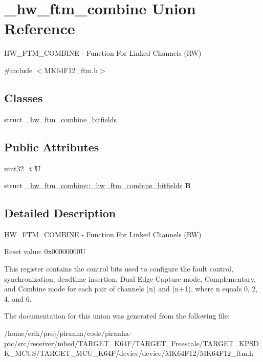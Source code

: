 \hypertarget{union__hw__ftm__combine}{}\section{\+\_\+hw\+\_\+ftm\+\_\+combine Union Reference}
\label{union__hw__ftm__combine}


H\+W\+\_\+\+F\+T\+M\+\_\+\+C\+O\+M\+B\+I\+NE -\/ Function For Linked Channels (RW)  




{\ttfamily \#include $<$M\+K64\+F12\+\_\+ftm.\+h$>$}

\subsection*{Classes}
\begin{DoxyCompactItemize}
\item 
struct \hyperlink{struct__hw__ftm__combine_1_1__hw__ftm__combine__bitfields}{\+\_\+hw\+\_\+ftm\+\_\+combine\+\_\+bitfields}
\end{DoxyCompactItemize}
\subsection*{Public Attributes}
\begin{DoxyCompactItemize}
\item 
uint32\+\_\+t {\bfseries U}\hypertarget{union__hw__ftm__combine_a754f09680367d3201310c0767f8fe38a}{}\label{union__hw__ftm__combine_a754f09680367d3201310c0767f8fe38a}

\item 
struct \hyperlink{struct__hw__ftm__combine_1_1__hw__ftm__combine__bitfields}{\+\_\+hw\+\_\+ftm\+\_\+combine\+::\+\_\+hw\+\_\+ftm\+\_\+combine\+\_\+bitfields} {\bfseries B}\hypertarget{union__hw__ftm__combine_aaf68fba5811ee26290946903e40e901b}{}\label{union__hw__ftm__combine_aaf68fba5811ee26290946903e40e901b}

\end{DoxyCompactItemize}


\subsection{Detailed Description}
H\+W\+\_\+\+F\+T\+M\+\_\+\+C\+O\+M\+B\+I\+NE -\/ Function For Linked Channels (RW) 

Reset value\+: 0x00000000U

This register contains the control bits used to configure the fault control, synchronization, deadtime insertion, Dual Edge Capture mode, Complementary, and Combine mode for each pair of channels (n) and (n+1), where n equals 0, 2, 4, and 6. 

The documentation for this union was generated from the following file\+:\begin{DoxyCompactItemize}
\item 
/home/erik/proj/piranha/code/piranha-\/ptc/src/receiver/mbed/\+T\+A\+R\+G\+E\+T\+\_\+\+K64\+F/\+T\+A\+R\+G\+E\+T\+\_\+\+Freescale/\+T\+A\+R\+G\+E\+T\+\_\+\+K\+P\+S\+D\+K\+\_\+\+M\+C\+U\+S/\+T\+A\+R\+G\+E\+T\+\_\+\+M\+C\+U\+\_\+\+K64\+F/device/device/\+M\+K64\+F12/M\+K64\+F12\+\_\+ftm.\+h\end{DoxyCompactItemize}
